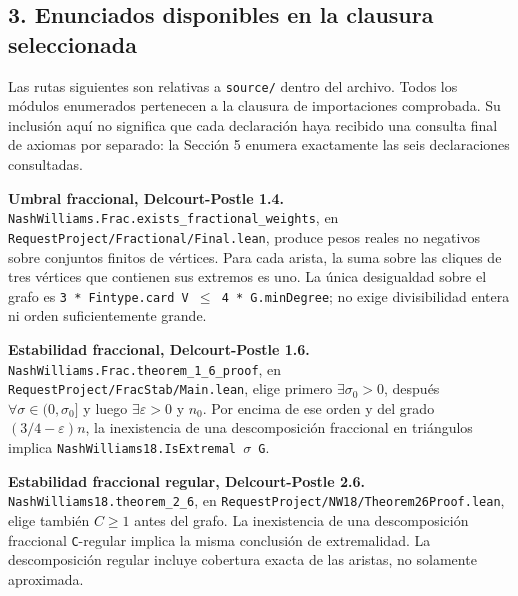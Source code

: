 \documentclass[spanish,11pt,a4paper]{article}
\begin{document}
\subsection{3. Enunciados disponibles en la clausura seleccionada}\label{enunciados-disponibles-en-la-clausura-seleccionada}

Las rutas siguientes son relativas a \texttt{source/\allowbreak{}} dentro del archivo. Todos los módulos enumerados pertenecen a la clausura de importaciones comprobada. Su inclusión aquí no significa que cada declaración haya recibido una consulta final de axiomas por separado: la Sección 5 enumera exactamente las seis declaraciones consultadas.

\textbf{Umbral fraccional, Delcourt-Postle 1.4.} \texttt{Nash\allowbreak{}Williams.\allowbreak{}Frac.\allowbreak{}exists\_\allowbreak{}fractional\_\allowbreak{}weights}, en \texttt{Request\allowbreak{}Project/\allowbreak{}Fractional/\allowbreak{}Final.\allowbreak{}lean}, produce pesos reales no negativos sobre conjuntos finitos de vértices. Para cada arista, la suma sobre las cliques de tres vértices que contienen sus extremos es uno. La única desigualdad sobre el grafo es \texttt{3\ *\ Fintype.\allowbreak{}card\ V\ \ensuremath{\le}\ 4\ *\ G.\allowbreak{}min\allowbreak{}Degree}; no exige divisibilidad entera ni orden suficientemente grande.

\textbf{Estabilidad fraccional, Delcourt-Postle 1.6.} \texttt{Nash\allowbreak{}Williams.\allowbreak{}Frac.\allowbreak{}theorem\_\allowbreak{}1\_\allowbreak{}6\_\allowbreak{}proof}, en \texttt{Request\allowbreak{}Project/\allowbreak{}Frac\allowbreak{}Stab/\allowbreak{}Main.\allowbreak{}lean}, elige primero \(\exists\sigma_0>0\), después \(\forall\sigma\in(0,\sigma_0]\) y luego \(\exists\varepsilon>0\) y \(n_0\). Por encima de ese orden y del grado \((3/4-\varepsilon)n\), la inexistencia de una descomposición fraccional en triángulos implica \texttt{Nash\allowbreak{}Williams18.\allowbreak{}Is\allowbreak{}Extremal\ \ensuremath{\sigma}\ G}.

\textbf{Estabilidad fraccional regular, Delcourt-Postle 2.6.} \texttt{Nash\allowbreak{}Williams18.\allowbreak{}theorem\_\allowbreak{}2\_\allowbreak{}6}, en \texttt{Request\allowbreak{}Project/\allowbreak{}NW18/\allowbreak{}Theorem26Proof.\allowbreak{}lean}, elige también \(C\ge1\) antes del grafo. La inexistencia de una descomposición fraccional \texttt{C}-regular implica la misma conclusión de extremalidad. La descomposición regular incluye cobertura exacta de las aristas, no solamente aproximada.
\end{document}

